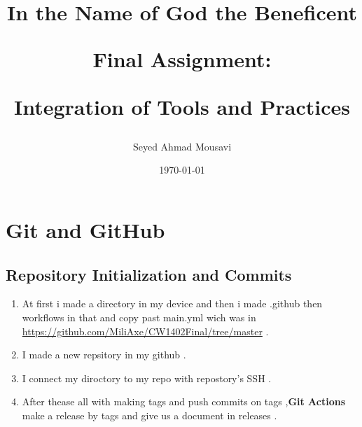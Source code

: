 \documentclass{article}
\begin{document}
\begin{titlepage}
\title{
\textbf{In the Name of God the Beneficent}\par
    \vspace{2in}

\textbf{Final Assignment:}\par

\textbf{Integration of Tools and Practices}\par
    \vspace{2in}
}
\author{Seyed Ahmad Mousavi}

\date{\today}
\maketitle
\thispagestyle{empty}
\end{titlepage}
\newpage

\tableofcontents

\fancyfoot[C]{}
\newpage

\section{Git and GitHub}
\subsection{Repository Initialization and Commits}
\begin{enumerate}
    \item {At first i made a directory in my device and then i made .github then workflows in that and copy past main.yml wich was in \url{https://github.com/MiliAxe/CW1402Final/tree/master} .}
    \item {I made a new repsitory in my github .}
    \item {I connect my diroctory to my repo with repostory's SSH .}
    \item {After thease all with making tags and push commits on tags ,\textbf{Git Actions} make a release by tags and give us a document in releases .}
\end{enumerate}
\end{document}
